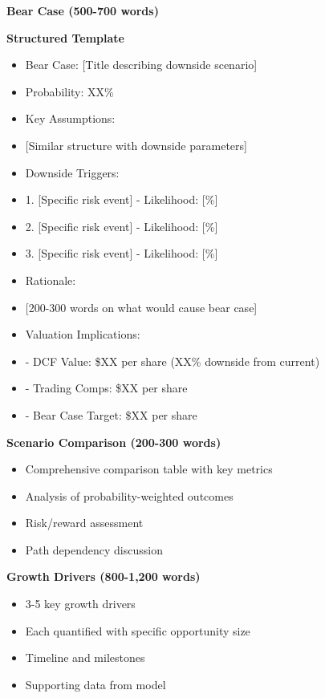 \documentclass[11pt]{article}
\begin{document}
\textbf{Bear Case (500-700 words)}

\textbf{Structured Template}
\begin{itemize}[leftmargin=*,itemsep=2pt,topsep=2pt]
\item {} Bear Case: [Title describing downside scenario]
\item {} Probability: XX\%
\item {} Key Assumptions:
\item {} [Similar structure with downside parameters]
\item {} Downside Triggers:
\item {} 1. [Specific risk event] - Likelihood: [\%]
\item {} 2. [Specific risk event] - Likelihood: [\%]
\item {} 3. [Specific risk event] - Likelihood: [\%]
\item {} Rationale:
\item {} [200-300 words on what would cause bear case]
\item {} Valuation Implications:
\item {} - DCF Value: \$XX per share (XX\% downside from current)
\item {} - Trading Comps: \$XX per share
\item {} - Bear Case Target: \$XX per share
\end{itemize}

\textbf{Scenario Comparison (200-300 words)}

\begin{itemize}[leftmargin=*,itemsep=2pt,topsep=2pt]
\item {} Comprehensive comparison table with key metrics
\item {} Analysis of probability-weighted outcomes
\item {} Risk/reward assessment
\item {} Path dependency discussion
\end{itemize}

\textbf{Growth Drivers (800-1,200 words)}

\begin{itemize}[leftmargin=*,itemsep=2pt,topsep=2pt]
\item {} 3-5 key growth drivers
\item {} Each quantified with specific opportunity size
\item {} Timeline and milestones
\item {} Supporting data from model
\end{itemize}
\end{document}
